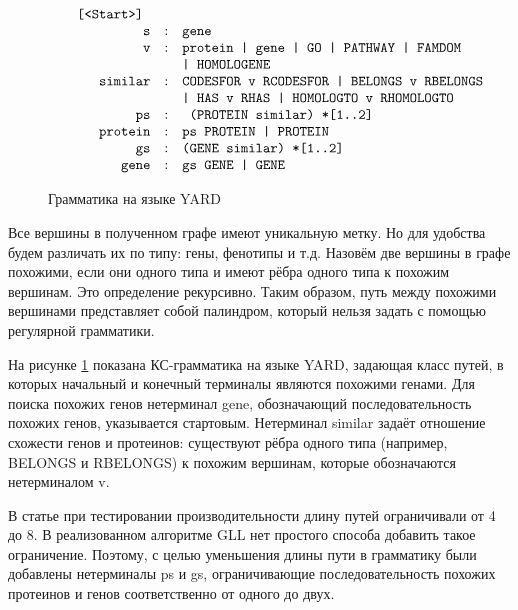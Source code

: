 \documentclass[14pt]{matmex-diploma}
\begin{document}
\begin{figure}
$$
\begin{array}{crcl}
&\mbox{\texttt{ [<Start>] }} \\
&\mbox{\texttt{s}} &:& \mbox{\texttt{gene }} \\
&\mbox{\texttt{v}} &:& \mbox{\texttt{protein | gene | GO | PATHWAY | FAMDOM}} \\
&&&\mbox{\texttt{| HOMOLOGENE}} \\
&\mbox{\texttt{similar}} &:& \mbox{\texttt{CODESFOR v RCODESFOR | BELONGS v RBELONGS}} \\
&&&\mbox{\texttt{| HAS v RHAS | HOMOLOGTO v RHOMOLOGTO}} \\
&\mbox{\texttt{ps}} & :& \mbox{\texttt{ (PROTEIN similar) *[1..2]}} \\
&\mbox{\texttt{protein}} & :& \mbox{\texttt{ps PROTEIN | PROTEIN}} \\
&\mbox{\texttt{gs}} & :& \mbox{\texttt{(GENE similar) *[1..2]}} \\
&\mbox{\texttt{gene}} & :& \mbox{\texttt{gs GENE | GENE}} \\
\end{array}
$$
\caption{Грамматика на языке YARD}
\label{grammar}
\end{figure}

Все вершины в полученном графе имеют уникальную метку. Но для удобства будем различать их по типу: гены, фенотипы и т.д. Назовём две вершины в графе похожими, если они одного типа и имеют рёбра одного типа к похожим вершинам. Это определение рекурсивно. Таким образом, путь между похожими вершинами представляет собой палиндром, который нельзя задать с помощью регулярной грамматики. 

На рисунке \ref{grammar} показана КС-грамматика на языке YARD, задающая класс путей, в которых начальный и конечный терминалы являются похожими генами. Для поиска похожих генов нетерминал gene, обозначающий последовательность похожих генов, указывается стартовым. Нетерминал similar задаёт отношение схожести генов и протеинов: существуют рёбра одного типа (например, BELONGS и RBELONGS) к похожим вершинам, которые обозначаются нетерминалом v.

В статье \cite{subgraph} при тестировании производительности длину путей ограничивали от 4 до 8. В реализованном алгоритме GLL нет простого способа добавить такое ограничение. Поэтому, с целью уменьшения длины пути в грамматику были добавлены нетерминалы ps и gs, ограничивающие последовательность похожих протеинов и генов соответственно от одного до двух.
\end{document}
